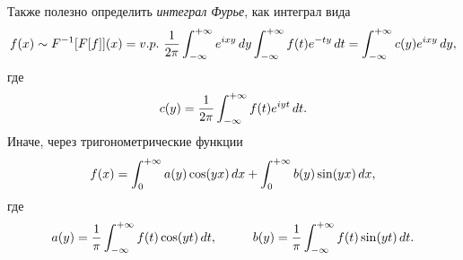 Также полезно определить \textit{интеграл Фурье}, как интеграл вида
\begin{equation*}
    f(x) \sim F^{-1}[F[f]](x) =  v.p. \ \frac{1}{2\pi} \int_{-\infty}^{+\infty} e^{ixy}\d y \int_{-\infty}^{+\infty} f(t) e^{-ty} \d t = \int_{-\infty}^{+\infty} c(y) e^{ixy} \d y,
\end{equation*}
где
\begin{equation*}
    c(y) = \frac{1}{2\pi} \int_{-\infty}^{+\infty}  f(t) e^{iyt} \, d t.
\end{equation*}
Иначе, через тригонометрические функции
\begin{equation*}
    f(x) = \int_0^{+\infty} a(y) \cos (yx) \, d x + \int_0^{+\infty}  b(y) \sin (yx) \, d x,
\end{equation*}
где
\begin{equation*}
    a(y) = \frac{1}{\pi} \int_{-\infty}^{+\infty} f(t) \cos (yt) \d t,
    \hspace{10 mm}
    b(y) = \frac{1}{\pi} \int_{-\infty}^{+\infty}  f(t) \sin (yt) \d t.
\end{equation*}